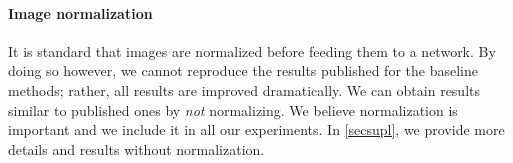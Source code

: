 \paragraph{Image normalization}

It is standard that images are normalized before feeding them to a network. By doing so however, 
we cannot reproduce the results published for the baseline methods; rather, all results are 
improved dramatically. We can obtain results similar to published ones by \emph{not} normalizing. 
We believe normalization is important and we include it in all our experiments. 
In \ref{secsupl}, we provide more details and results without normalization.
